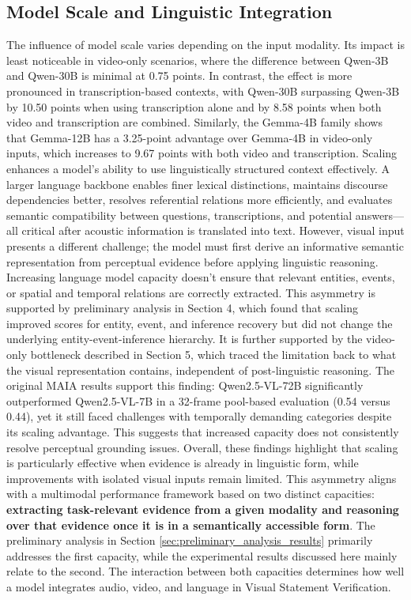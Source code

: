 \subsection*{Model Scale and Linguistic Integration}
\label{subsec:model_scale_linguistic}
The influence of model scale varies depending on the input modality. Its impact is least noticeable in video-only scenarios, where the difference between Qwen-3B and Qwen-30B is minimal at 0.75 points. In contrast, the effect is more pronounced in transcription-based contexts, with Qwen-30B surpassing Qwen-3B by 10.50 points when using transcription alone and by 8.58 points when both video and transcription are combined. Similarly, the Gemma-4B family shows that Gemma-12B has a 3.25-point advantage over Gemma-4B in video-only inputs, which increases to 9.67 points with both video and transcription.
Scaling enhances a model's ability to use linguistically structured context effectively. A larger language backbone enables finer lexical distinctions, maintains discourse dependencies better, resolves referential relations more efficiently, and evaluates semantic compatibility between questions, transcriptions, and potential answers—all critical after acoustic information is translated into text. However, visual input presents a different challenge; the model must first derive an informative semantic representation from perceptual evidence before applying linguistic reasoning. Increasing language model capacity doesn't ensure that relevant entities, events, or spatial and temporal relations are correctly extracted.
This asymmetry is supported by preliminary analysis in Section 4, which found that scaling improved scores for entity, event, and inference recovery but did not change the underlying entity-event-inference hierarchy. It is further supported by the video-only bottleneck described in Section 5, which traced the limitation back to what the visual representation contains, independent of post-linguistic reasoning. The original MAIA results support this finding: Qwen2.5-VL-72B significantly outperformed Qwen2.5-VL-7B in a 32-frame pool-based evaluation (0.54 versus 0.44), yet it still faced challenges with temporally demanding categories despite its scaling advantage. This suggests that increased capacity does not consistently resolve perceptual grounding issues.
Overall, these findings highlight that scaling is particularly effective when evidence is already in linguistic form, while improvements with isolated visual inputs remain limited. This asymmetry aligns with a multimodal performance framework based on two distinct capacities: \textbf{extracting task-relevant evidence from a given modality and reasoning over that evidence once it is in a semantically accessible form}. The preliminary analysis in Section \ref{sec:preliminary_analysis_results} primarily addresses the first capacity, while the experimental results discussed here mainly relate to the second. The interaction between both capacities determines how well a model integrates audio, video, and language in Visual Statement Verification.

